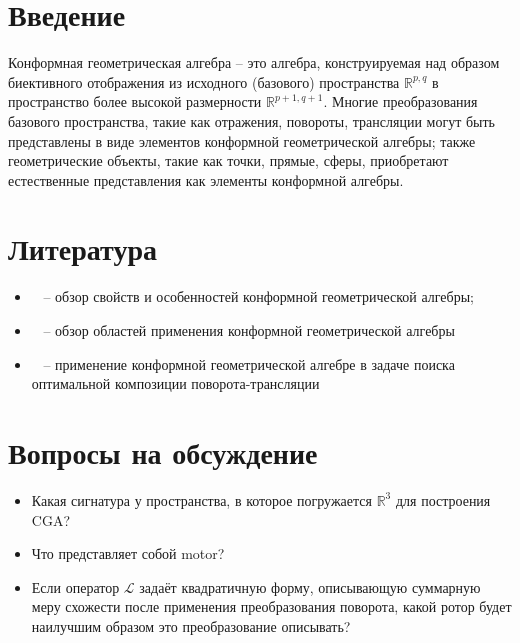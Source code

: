 \section{Введение}

Конформная геометрическая алгебра -- это алгебра, конструируемая над образом биективного отображения из исходного (базового) пространства $\mathbb{R}^{p, q}$ в пространство более высокой размерности $\mathbb{R}^{p+1, q+1}$. Многие преобразования базового пространства, такие как отражения, повороты, трансляции могут быть представлены в виде элементов конформной геометрической алгебры; также геометрические объекты, такие как точки, прямые, сферы, приобретают естественные представления как элементы конформной алгебры.

\section{Литература}

	\begin{itemize}
		\item ~\cite{Sommer2001} -- обзор свойств и особенностей конформной геометрической алгебры;
		\item ~\cite{Heidelberg2009} -- обзор областей применения конформной геометрической алгебры
		\item ~\cite{Valkenburg2011} -- применение конформной геометрической алгебре в задаче поиска оптимальной композиции поворота-трансляции
	\end{itemize}
	
\section{Вопросы на обсуждение}

	\begin{itemize}
    \item Какая сигнатура у пространства, в которое погружается $\mathbb{R}^3$ для построения CGA?
    \item Что представляет собой motor?
    \item Если оператор $\mathcal{L}$ задаёт квадратичную форму, описывающую суммарную меру схожести после применения преобразования поворота, какой ротор будет наилучшим образом это преобразование описывать?
\end{itemize}
